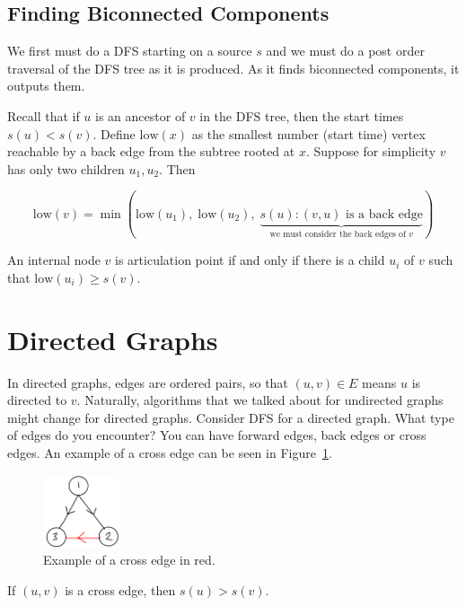 \subsection{Finding Biconnected Components}

We first must do a DFS starting on a source $s$ and we must do a post
order traversal of the DFS tree as it is produced. As it finds
biconnected components, it outputs them.

Recall that if $u$ is an ancestor of $v$ in the DFS tree, then the
start times $s(u) < s(v)$. Define $\text{low}(x)$ as 
the smallest number (start time) vertex reachable by a back edge from
the subtree rooted at $x$. Suppose for simplicity $v$ has only two
children $u_1, u_2$. Then 

$$
\text{low}(v) = \min(\text{low}(u_1), \; \text{low}(u_2),
\; \underbrace{s(u) : \text{$(v, u)$ is a back edge}}_{\text{we must
consider the back edges of $v$}})
$$

\begin{lemma}
    An internal node $v$ is articulation point if and only if there
    is a child $u_i$ of $v$ such that $\text{low}(u_i) \geq s(v)$.
\end{lemma}

\section{Directed Graphs}

In directed graphs, edges are ordered pairs, so that $(u, v) \in E$
means $u$ is directed to $v$. Naturally, algorithms that we talked
about for undirected graphs might change for directed graphs. Consider
DFS for a directed graph. What type of edges do you encounter? You can
have forward edges, back edges or cross edges. An example of a cross
edge can be seen in Figure~\ref{fig:cross-edge}.

\begin{figure}[hpt]
    \centering
    \includegraphics[width=0.2\textwidth]{figures/cross-edge.jpeg}
    \caption{Example of a cross edge in red.}
    \label{fig:cross-edge}
\end{figure}

If $(u, v)$ is a cross edge, then $s(u) > s(v)$.

